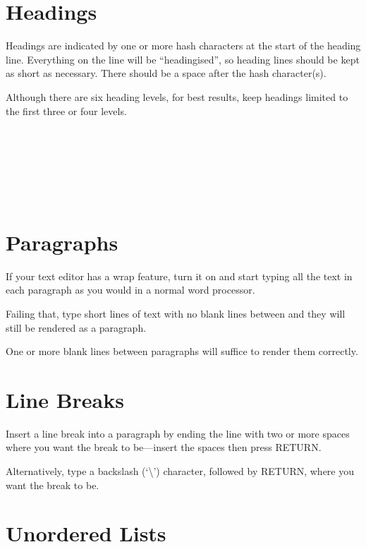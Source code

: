 \section{Headings}

Headings are indicated by one or more hash characters at the start of the heading line. Everything on the line will be ``headingised'', so heading lines should be kept as short as necessary. There should be a space after the hash character(s).

Although there are six heading levels, for best results, keep headings limited to the first three or four levels.\\

\noindent{}\\
\\
\\
\\
\\
\\

\section{Paragraphs}

If your text editor has a wrap feature, turn it on and start typing all the text in each paragraph as you would in a normal word processor.

Failing that, type short lines of text with no blank lines between and they will still be rendered as a paragraph.

One or more blank lines between paragraphs will suffice to render them correctly.


\section{Line Breaks}

Insert a line break into a paragraph by ending the line with two or more spaces where you want the break to be---insert the spaces then press RETURN.

Alternatively, type a backslash (`\textbackslash') character, followed by RETURN, where you want the break to be.

\section{Unordered Lists}

